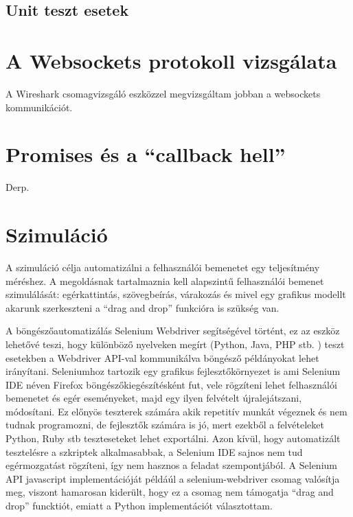 \subsection{Unit teszt esetek}


\section{A Websockets protokoll vizsgálata}

A Wireshark csomagvizsgáló eszközzel megvizsgáltam jobban a websockets kommunikációt.  




\section{Promises és a ``callback hell''}
Derp.


\section{Szimuláció}
A szimuláció célja automatizálni a felhasználói bemenetet egy teljesítmény méréshez. A megoldásnak tartalmaznia kell alapszintű felhasználói bemenet szimulálását: egérkattintás, szövegbeírás, várakozás és mivel egy grafikus modellt akarunk szerkeszteni a ``drag and drop'' funkcióra is szükség van. 

A böngészőautomatizálás Selenium Webdriver segítségével történt, ez az eszköz lehetővé teszi, hogy különböző nyelveken megírt (Python, Java, PHP stb. ) teszt esetekben a Webdriver API-val kommunikálva böngésző példányokat lehet irányítani. 
Seleniumhoz tartozik egy grafikus fejlesztőkörnyezet is ami Selenium IDE néven Firefox böngészőkiegészítésként fut, vele rögzíteni lehet felhasználói bemenetet és egér eseményeket, majd egy ilyen felvételt újralejátszani, módosítani. Ez előnyös teszterek számára akik repetitív munkát végeznek és nem tudnak programozni, de fejlesztők számára is jó, mert ezekből a felvételeket Python, Ruby stb teszteseteket lehet exportálni. 
Azon kívül, hogy automatizált tesztelésre a szkriptek alkalmasabbak, a Selenium IDE sajnos nem tud egérmozgatást rögzíteni, így nem hasznos a feladat szempontjából. A Selenium API javascript implementációját példáúl a selenium-webdriver csomag valósítja meg, viszont hamarosan kiderült, hogy ez a csomag nem támogatja ``drag and drop'' funcktiót, emiatt a Python implementációt választottam. 
